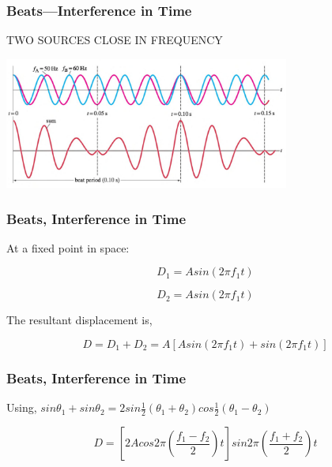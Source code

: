 \documentclass[]{beamer}
\begin{document}
\begin{frame}
  \frametitle{Beats—Interference in Time}
  
  TWO SOURCES CLOSE IN FREQUENCY 
  \pause
  \vspace{5mm}

    \begin{center}
    \includegraphics[height=1.7in]{images4/beats.jpg}
  \end{center}
  
  
  
    \end{frame}
  
  

  
  
  \begin{frame}
  \frametitle{Beats, Interference in Time}
  
  
  At a fixed point in space:
  
  \begin{equation*}
  D_1=Asin(2\pi f_1t)
  \end{equation*}
  
  \pause
  \begin{equation*}
  D_2=Asin(2\pi f_1t)
  \end{equation*}
  \pause
  
  The resultant displacement is,
  
  \pause
  
  \begin{equation*}
  D=D_1+D_2=A[Asin(2\pi f_1t)+sin(2\pi f_1t)]
  \end{equation*}

  
    \end{frame}
  
  
  
  \begin{frame}
  \frametitle{Beats, Interference in Time}
  
  
  
  
  Using, $sin\theta_1+sin\theta_2=2sin\frac{1}{2}(\theta_1+\theta_2)cos\frac{1}{2}(\theta_1-\theta_2)$
  
  \pause
  
  \begin{equation}
  D=\left[2Acos2\pi\left(\frac{f_1-f_2}{2}\right)t\right] sin2\pi\left(\frac{f_1+f_2}{2}\right)t
  \end{equation}
  
    \end{frame}
  
\end{document}
